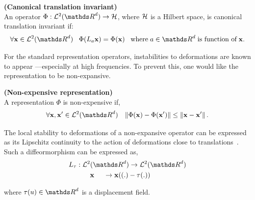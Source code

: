 \documentclass[a4paper,11pt]{report}
\begin{document}
      \begin{defn} \textbf{(Canonical translation invariant)}\\ 
				An operator $\Phi: \mcalL^{2}(\dsR^{d}) \rightarrow \mcalH$, where $\mathcal{H}$ is a Hilbert space, is canonical translation invariant if:
        \begin{equation*}
			  		\forall \bfx \in \mcalL^{2}(\dsR^{d}) \;\;\;
			  		\Phi(L_{a}\bfx) = \Phi(\bfx) 
			  		\;\;\; \text{where} \; a \in \dsR^{d} \; \text{is function of} \; \bfx.
				\end{equation*}
				\label{def:Canonical translation invariance - intuition}
      \end{defn}
      
      For the standard representation operators, instabilities to deformations are known to appear ---especially at high frequencies. To prevent this, one would like the representation to be non-expansive.
      
      \begin{defn} \textbf{(Non-expensive representation)}\\
				A representation $\Phi$ is non-expensive if,
				\begin{equation}
			  		\forall \bfx,\bfx' \in \mcalL^{2}(\dsR^{d}) \;\;\; 
			  		\norm{\Phi(\bfx) - \Phi(\bfx')} \leq \norm{\bfx-\bfx'}.
				\end{equation}
				\label{def:Non-expansivity - intuition}
      \end{defn}
      
      The local stability to deformations of a non-expansive operator can be expressed as its Lipschitz continuity to the action of deformations close to translations~\citep{mallat2012gis}. Such a diffeormorphism can be expressed as,
      \begin{equation*}
      		\begin{split}
      			L_{\tau}	: \; & \mcalL^{2}(\dsR^{d}) \rightarrow \mcalL^{2}(\dsR^{d})\\
      							  & \;\;\;\; \bfx \;\;\;\;\; \rightarrow  \bfx((.) - \tau(.))
				\end{split}
      \end{equation*}

			where $\tau(u) \in \dsR^{d}$ is a displacement field.
			
\end{document}
